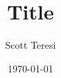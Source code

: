 \documentclass[12pt,letterpaper]{article}
\date{\today}
\author{Scott Teresi}
\title{Title}
\begin{document}
\begin{flushright}
\small
\textbf{\@author}\\
\@title\\
\@date\\
\end{flushright}

\makeatother
\normalsize
\lipsum









\end{document}
